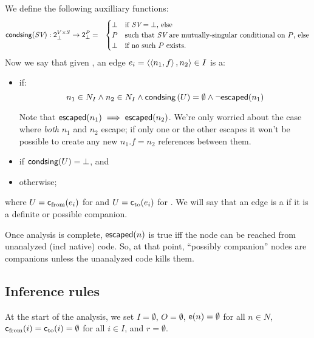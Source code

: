 \documentclass[11pt,notitlepage]{article}
\newcommand{\bigvar}[1]{\ensuremath{\text{\it #1}}}
\newcommand{\func}[1]{\ensuremath{\text{\sffamily #1}}}
\begin{document}

We define the following auxilliary functions:
\begin{eqnarray*}
\func{condsing}(\bigvar{SV}):2^{V\times S}_\bot\to 2^P_\bot &=& \begin{cases}
\bot & \text{if }\bigvar{SV}=\bot\text{, else}\\
P&\text{such that }\bigvar{SV}\text{ are mutually-singular conditional
                                     on }P\text{, else} \\
\bot & \text{if no such }P\text{ exists.}
\end{cases}
\end{eqnarray*}
Now we say that given \ptgraph,
an edge $e_i=\left\langle \left\langle n_1,f \right\rangle,n_2 \right\rangle \in I$ is a:
\begin{itemize}
\item {} if:
\[
 n_1\in N_I \wedge n_2\in N_I \wedge
 \func{condsing}\left(U\right)=\emptyset \wedge
 \neg\func{escaped}(n_1)
\]

Note that $\func{escaped}(n_1)\implies\func{escaped}(n_2)$.  
We're only worried about the case where {\it both} $n_1$ and $n_2$
escape; if only one or the other escapes it won't be possible to
create any new $n_1.f=n_2$ references between them.
\item {} if \(
 \func{condsing}(U) = \bot
\), and
\item {} otherwise;
\end{itemize}
where 
$U=\func{c}_\text{from}(e_i)$ for  and
$U=\func{c}_\text{to}(e_i)$ for .
We will say that an edge is a  if it is a
definite or possible companion.  

Once analysis is complete, $\func{escaped}(n)$ is true iff the node
can be reached from unanalyzed (incl native) code.  So, at that point,
``possibly companion'' nodes are companions unless the unanalyzed code
kills them.

\subsection{Inference rules}
At the start of the analysis, we set $I=\emptyset$, $O=\emptyset$,
$\func{e}(n)=\emptyset$ for all $n\in N$, 
$\func{c}_\text{from}(i)=\func{c}_\text{to}(i)=\emptyset$ for all $i\in I$,
and $r=\emptyset$.
\end{document}
